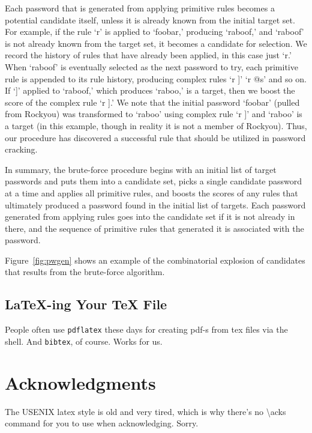 \documentclass[letterpaper,twocolumn,10pt]{article}
\begin{document}
Each password that is generated from applying primitive rules becomes a potential candidate itself, unless it is already known from the initial target set. For example, if the rule `r' is applied to `foobar,' producing `raboof,' and `raboof' is not already known from the target set, it becomes a candidate for selection. We record the history of rules that have already been applied, in this case just `r.' When `raboof' is eventually selected as the next password to try, each primitive rule is appended to its rule history, producing complex rules `r ]' `r @s' and so on. If `]' applied to `raboof,' which produces `raboo,' is a target, then we boost the score of the complex rule `r ].' We note that the initial password `foobar' (pulled from Rockyou) was transformed to `raboo' using complex rule `r ]' and `raboo' is a target (in this example, though in reality it is not a member of Rockyou). Thus, our procedure has discovered a successful rule that should be utilized in password cracking.

In summary, the brute-force procedure begins with an initial list of target passwords and puts them into a candidate set, picks a single candidate password at a time and applies all primitive rules, and boosts the scores of any rules that ultimately produced a password found in the initial list of targets. Each password generated from applying rules goes into the candidate set if it is not already in there, and the sequence of primitive rules that generated it is associated with the password.

Figure~\ref{fig:pwgen} shows an example of the combinatorial explosion of candidates that results from the brute-force algorithm.

\subsection{LaTeX-ing Your TeX File}

People often use \texttt{pdflatex} these days for creating pdf-s from
tex files via the shell. And \texttt{bibtex}, of course. Works for us.

\section*{Acknowledgments}

The USENIX latex style is old and very tired, which is why
there's no \textbackslash{}acks command for you to use when
acknowledging. Sorry.
\end{document}
